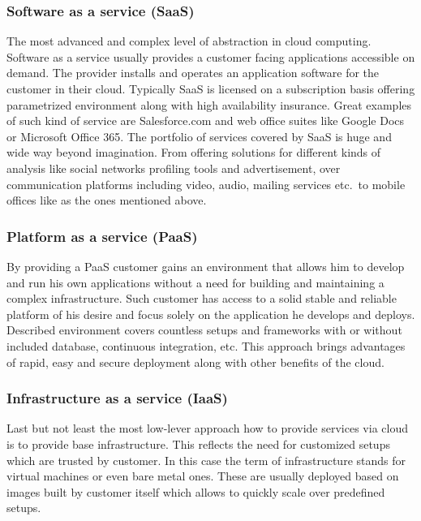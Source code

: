 \subsubsection{Software as a service (SaaS)}
\label{subs:Software as a service (SaaS)}

The most advanced and complex level of abstraction in cloud computing. Software as a service usually provides a customer facing applications accessible on demand. The provider installs and operates an application software for the customer in their cloud. Typically SaaS is licensed on a subscription basis offering parametrized environment along with high availability insurance. Great examples of such kind of service are Salesforce.com and web office suites like Google Docs or Microsoft Office 365. The portfolio of services covered by SaaS is huge and wide way beyond imagination. From offering solutions for different kinds of analysis like social networks profiling tools and advertisement, over communication platforms including video, audio, mailing services etc.\ to mobile offices like as the ones mentioned above.

\subsubsection{Platform as a service (PaaS)}
\label{subs:Platform as a service (PaaS)}

By providing a PaaS customer gains an environment that allows him to develop and run his own applications without a need for building and maintaining a complex infrastructure. Such customer has access to a solid stable and reliable platform of his desire and focus solely on the application he develops and deploys. Described environment covers countless setups and frameworks with or without included database, continuous integration, etc. This approach brings advantages of rapid, easy and secure deployment along with other benefits of the cloud.

\subsubsection{Infrastructure as a service (IaaS)}
\label{subs:Infrastructure as a service (IaaS)}

Last but not least the most low-lever approach how to provide services via cloud is to provide base infrastructure. This reflects the need for customized setups which are trusted by customer. In this case the term of infrastructure stands for virtual machines or even bare metal ones. These are usually deployed based on images built by customer itself which allows to quickly scale over predefined setups.
